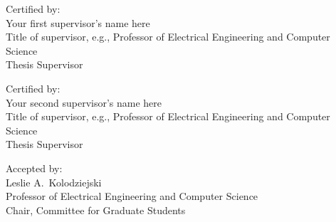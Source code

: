 \vspace{.15in}

\noindent
Certified by: \underline{\mbox{\hspace{4.827in}}} \\
\vspace{-.25in}
{\flushright Your first supervisor's name here \\
Title of supervisor, e.g., Professor of Electrical Engineering and Computer Science \\
Thesis Supervisor \\
}

\vspace{.15in}

\noindent
Certified by: \underline{\mbox{\hspace{4.827in}}} \\
\vspace{-.25in}
{\flushright Your second supervisor's name here \\
Title of supervisor, e.g., Professor of Electrical Engineering and Computer Science \\
Thesis Supervisor \\
}

\vspace{.15in}

\noindent
Accepted by: \underline{\mbox{\hspace{4.79in}}} \\
\vspace{-.25in}
{\flushright Leslie A.~Kolodziejski \\
Professor of Electrical Engineering and Computer Science \\
Chair, Committee for Graduate Students \\
}

\cleardoublepage
